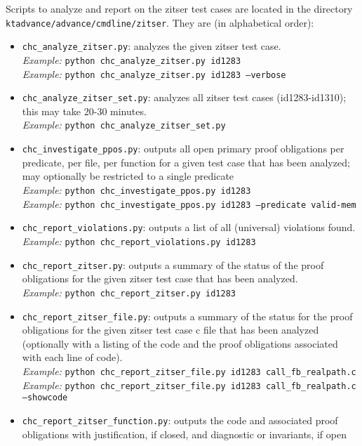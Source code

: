 \documentclass[11pt]{article}
\begin{document}
Scripts to analyze and report on the zitser test cases are located in the
directory \\ {\tt ktadvance/advance/cmdline/zitser}. They are (in alphabetical order):
\begin{itemize}[leftmargin=*]
\item {\tt chc\_analyze\_zitser.py}: analyzes the given zitser test case.\\
\emph{Example:} {\tt python chc\_analyze\_zitser.py id1283} \\
\emph{Example:} {\tt python chc\_analyze\_zitser.py id1283 --verbose}
\item {\tt chc\_analyze\_zitser\_set.py}: analyzes all zitser test cases (id1283-id1310);
  this may take 20-30 minutes. \\
\emph{Example:} {\tt python chc\_analyze\_zitser\_set.py}
\item {\tt chc\_investigate\_ppos.py}: outputs all open primary proof obligations per 
   predicate, per file, per function for a given test case that has been analyzed; 
   may optionally be restricted to a single predicate \\
\emph{Example:} {\tt python chc\_investigate\_ppos.py id1283} \\
\emph{Example:} {\tt python chc\_investigate\_ppos.py id1283 --predicate valid-mem}
\item {\tt chc\_report\_violations.py}: outputs a list of all (universal) violations
   found.\\
\emph{Example:} {\tt python chc\_report\_violations.py id1283}
\item {\tt chc\_report\_zitser.py}: outputs a summary of the status of the proof 
   obligations for the given zitser test case that has been analyzed.\\
\emph{Example:} {\tt python chc\_report\_zitser.py id1283}
\item {\tt chc\_report\_zitser\_file.py}: outputs a summary of the status for the
  proof obligations for the given zitser test case c file that has been analyzed
  (optionally with a listing of the code and the proof obligations associated with
  each line of code).\\
\emph{Example:} {\tt python chc\_report\_zitser\_file.py id1283 call\_fb\_realpath.c} \\
\emph{Example:} {\tt python chc\_report\_zitser\_file.py id1283 call\_fb\_realpath.c --showcode}
\item {\tt chc\_report\_zitser\_function.py}: outputs the code and associated proof
  obligations with justification, if closed, and diagnostic or invariants, if open

\end{itemize}
\end{document}
